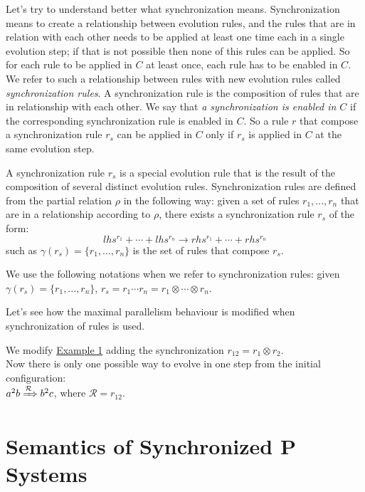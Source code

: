 Let's try to understand better what synchronization means.
Synchronization means to create a relationship between evolution rules, and the rules that are in relation with each other needs to be applied at least one time each in a single evolution step;
if that is not possible then none of this rules can be applied.
So for each rule to be applied in $C$ at least once, each rule has to be enabled in $C$.
We refer to such a relationship between rules with new evolution rules called \textit{synchronization rules}.
A synchronization rule is the composition of rules that are in relationship with each other.
We say that \textit{a synchronization is enabled in $C$} if the corresponding synchronization rule is enabled in $C$. 
So a rule $r$ that compose a synchronization rule $r_s$ can be applied in $C$ only if $r_s$ is applied in $C$ at the same evolution step. 

\begin{definition}
\label{def:sync_rule}
A synchronization rule $r_s$ is a special evolution rule that is the result of the composition of several distinct evolution rules.
Synchronization rules are defined from the partial relation $\rho$ in the following way:\newline
given a set of rules $r_1,...,r_n$ that are in a relationship according to $\rho$, there exists
a synchronization rule $r_s$ of the form:
\[ lhs^{r_1} + \cdots + lhs^{r_n} \rightarrow rhs^{r_1} + \cdots + rhs^{r_n} \] 
such as $\gamma(r_s)=\{r_1,...,r_n\}$ is the set of rules that compose $r_s$.

We use the following notations when we refer to synchronization rules: \newline
given $\gamma(r_s)=\{r_1,...,r_n\}$, $r_s=r_1 \cdots r_n = r_1 \otimes \cdots \otimes r_n$.
\end{definition}

Let's see how the maximal parallelism behaviour is modified when synchronization of rules is used.
\begin{example}
    We modify \hyperref[ex:flat_membrane]{Example 1} adding the synchronization 
    $r_{12} = r_1 \otimes r_2$.\\
    Now there is only one possible way to evolve in one step from the initial configuration:\\
    $a^2b \xRightarrow{\mathcal{R}} b^2c$, where $\mathcal{R}=r_{12}$.
\end{example}

\section{Semantics of Synchronized P Systems}

